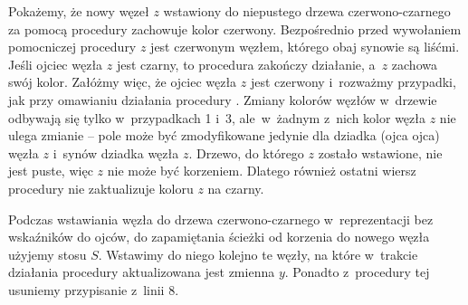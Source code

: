 \exercise %
Pokażemy, że nowy węzeł $z$ wstawiony do niepustego drzewa czerwono-czarnego za pomocą procedury  zachowuje kolor czerwony.
Bezpośrednio przed wywołaniem pomocniczej procedury  $z$ jest czerwonym węzłem, którego obaj synowie są liśćmi.
Jeśli ojciec węzła $z$ jest czarny, to procedura zakończy działanie, a~$z$ zachowa swój kolor.
Załóżmy więc, że ojciec węzła $z$ jest czerwony i~rozważmy przypadki, jak przy omawianiu działania procedury .
Zmiany kolorów węzłów w~drzewie odbywają się tylko w~przypadkach 1 i~3, ale~w~żadnym z~nich kolor węzła $z$ nie ulega zmianie -- pole  może być zmodyfikowane jedynie dla dziadka (ojca ojca) węzła $z$ i~synów dziadka węzła $z$.
Drzewo, do którego $z$ zostało wstawione, nie jest puste, więc $z$ nie może być korzeniem.
Dlatego również ostatni wiersz procedury  nie zaktualizuje koloru $z$ na czarny.

\exercise %
Podczas wstawiania węzła do drzewa czerwono-czarnego w~reprezentacji bez wskaźników do ojców, do zapamiętania ścieżki od korzenia do nowego węzła użyjemy stosu $S$.
Wstawimy do niego kolejno te węzły, na które w~trakcie działania procedury  aktualizowana jest zmienna $y$.
Ponadto z~procedury tej usuniemy przypisanie z~linii 8.

